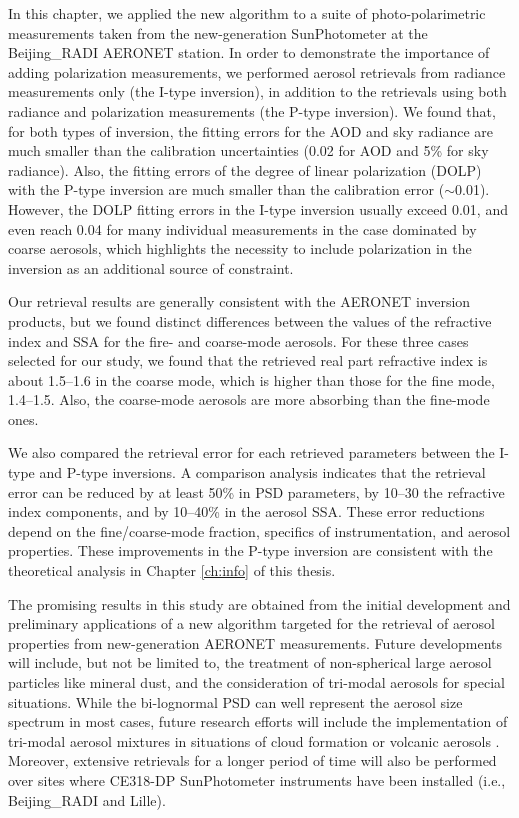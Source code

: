In this chapter, we applied the new algorithm to a suite of photo-polarimetric
measurements taken from the new-generation SunPhotometer at the Beijing\_RADI
AERONET station. In order to demonstrate the importance of adding polarization
measurements, we performed aerosol retrievals from radiance measurements only
(the I-type inversion), in addition to the retrievals using both radiance and
polarization measurements (the P-type inversion). We found that, for both types
of inversion, the fitting errors for the AOD and sky radiance are much smaller
than the calibration uncertainties (0.02 for AOD and 5\% for sky radiance).
Also, the fitting errors of the degree of linear polarization (DOLP) with the
P-type inversion are much smaller than the calibration error ($\sim$0.01). However,
the DOLP fitting errors in the I-type inversion usually exceed 0.01, and even
reach 0.04 for many individual measurements in the case dominated by coarse
aerosols, which highlights the necessity to include polarization in the
inversion as an additional source of constraint.

Our retrieval results are generally consistent with the AERONET inversion
products, but we found distinct differences between the values of the
refractive index and SSA for the fire- and coarse-mode aerosols. For these
three cases selected for our study, we found that the retrieved real part
refractive index is about 1.5--1.6 in the coarse mode, which is higher than
those for the fine mode, 1.4--1.5. Also, the coarse-mode aerosols are more
absorbing than the fine-mode ones.

We also compared the retrieval error for each retrieved parameters between the
I-type and P-type inversions. A comparison analysis indicates that the
retrieval error can be reduced by at least 50\% in PSD parameters, by 10–30%
the refractive index components, and by 10--40\% in the aerosol SSA. These error
reductions depend on the fine/coarse-mode fraction, specifics of
instrumentation, and aerosol properties. These improvements in the P-type
inversion are consistent with the theoretical analysis in Chapter \ref{ch:info}
of this thesis.

The promising results in this study are obtained from the initial development
and preliminary applications of a new algorithm targeted for the retrieval of
aerosol properties from new-generation AERONET measurements. Future
developments will include, but not be limited to, the treatment of
non-spherical large aerosol particles like mineral dust, and the consideration
of tri-modal aerosols for special situations. While the bi-lognormal PSD can
well represent the aerosol size spectrum in most cases, future research efforts 
will include the implementation of tri-modal aerosol mixtures in situations of
cloud formation \citep{Eck12} or volcanic aerosols \citep{Eck10}.
Moreover, extensive retrievals for a longer period of time will also be
performed over sites where CE318-DP SunPhotometer instruments have been
installed (i.e., Beijing\_RADI and Lille).
